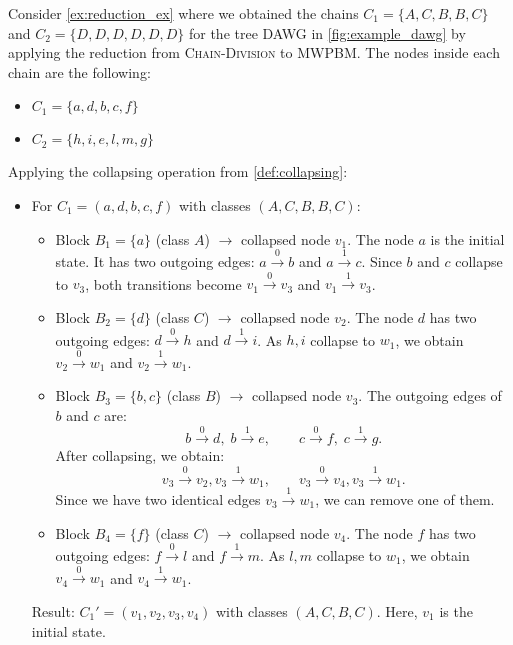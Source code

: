 \begin{example}
    Consider \cref{ex:reduction_ex} where we obtained the chains $C_1 = \{A,C,B,B,C\}$ and $C_2 = \{D,D,D,D,D,D\}$ for the tree DAWG in \cref{fig:example_dawg} by applying the reduction from \textsc{Chain-Division} to \textsc{MWPBM}. The nodes inside each chain are the following:
    \begin{itemize}
        \item $C_1 = \{a,d,b,c,f\}$
        \item $C_2 = \{h,i,e,l,m,g\}$
    \end{itemize}
    
    Applying the collapsing operation from \cref{def:collapsing}:
    \begin{itemize}
        \item For $C_1 = (a,d,b,c,f)$ with classes $(A,C,B,B,C)$: 
        \begin{itemize}
            \item Block $B_1 = \{a\}$ (class $A$) $\rightarrow$ collapsed node $v_1$. The node $a$ is the initial state. It has two outgoing edges: $a \xrightarrow{0} b$ and $a \xrightarrow{1} c$. Since $b$ and $c$ collapse to $v_3$, both transitions become $v_1 \xrightarrow{0} v_3$ and $v_1 \xrightarrow{1} v_3$.
            \item Block $B_2 = \{d\}$ (class $C$) $\rightarrow$ collapsed node $v_2$. The node $d$ has two outgoing edges: $d \xrightarrow{0} h$ and $d \xrightarrow{1} i$. As $h,i$ collapse to $w_1$, we obtain $v_2 \xrightarrow{0} w_1$ and $v_2 \xrightarrow{1} w_1$.
            \item Block $B_3 = \{b,c\}$ (class $B$) $\rightarrow$ collapsed node $v_3$. The outgoing edges of $b$ and $c$ are:
            \[
                b \xrightarrow{0} d,\; b \xrightarrow{1} e,\qquad
                c \xrightarrow{0} f,\; c \xrightarrow{1} g.
            \]
            After collapsing, we obtain:
            \[
                v_3 \xrightarrow{0} v_2, v_3 \xrightarrow{1} w_1,\qquad v_3 \xrightarrow{0} v_4, v_3 \xrightarrow{1} w_1.
            \]
            Since we have two identical edges $v_3 \xrightarrow{1} w_1$, we can remove one of them.
            \item Block $B_4 = \{f\}$ (class $C$) $\rightarrow$ collapsed node $v_4$. The node $f$ has two outgoing edges: $f \xrightarrow{0} l$ and $f \xrightarrow{1} m$. As $l,m$ collapse to $w_1$, we obtain $v_4 \xrightarrow{0} w_1$ and $v_4 \xrightarrow{1} w_1$.
        \end{itemize}
        Result: $C_1' = (v_1, v_2, v_3, v_4)$ with classes $(A, C, B, C)$. Here, $v_1$ is the initial state.
        

\end{itemize}
\end{example}
